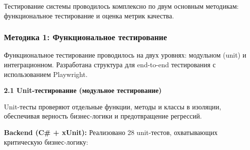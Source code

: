 
Тестирование системы проводилось комплексно по двум основным методикам: функциональное тестирование и оценка метрик качества.

\subsubsection*{Методика 1: Функциональное тестирование}

Функциональное тестирование проводилось на двух уровнях: модульном (unit) и интеграционном. Разработана структура для end-to-end тестирования с использованием Playwright.

\textbf{2.1 Unit-тестирование (модульное тестирование)}

Unit-тесты проверяют отдельные функции, методы и классы в изоляции, обеспечивая верность бизнес-логики и предотвращение регрессий.

\textbf{Backend (C\# + xUnit):} Реализовано 28 unit-тестов, охватывающих критическую бизнес-логику:

